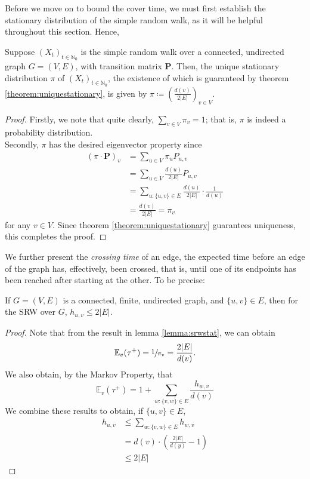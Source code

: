 	Before we move on to bound the cover time, we must first establish the stationary 
	distribution of the simple random walk, as it will be helpful throughout this section.
	Hence,
	\begin{lemma}
		\label{lemma:srwstat}
		Suppose $(X_t)_{t\in\mathbb{N}_0}$ is the simple random walk over a connected,
		undirected graph $G = (V,E)$, with transition matrix $\mathbf{P}$. Then, 
		the unique stationary distribution $\pi$ of $(X_t)_{t\in\mathbb{N}_0}$, the 
		existence of which is guaranteed by theorem \ref{theorem:uniquestationary},
		is given by $\pi \coloneqq \left(\frac{d(v)}{2|E|}\right)_{v \in V}$.
	\end{lemma}
	\begin{proof}
		Firstly, we note that quite clearly, $\sum_{v\in V} \pi_v = 1$; that is, $\pi$
		is indeed a probability distribution. \\
		Secondly, $\pi$ has the desired eigenvector property since
		\begin{align*}
			(\pi\cdot\mathbf{P})_v &= \sum_{u \in V} \pi_u P_{u,v} \\
			&= \sum_{u\in V} \frac{d(u)}{2|E|} P_{u,v} \\
			&= \sum_{u:\{u,v\}\in E} \frac{d(u)}{2|E|} \cdot \frac{1}{d(u)} \\
			&= \frac{d(v)}{2|E|} = \pi_v
		\end{align*}
		for any $v \in V$. Since theorem \ref{theorem:uniquestationary} guarantees 
		uniqueness, this completes the proof.
	\end{proof}
	We further present the \emph{crossing time} of an edge, the expected time before an edge of
	the graph has, effectively, been crossed, that is, until one of its endpoints has been 
	reached after starting at the other. To be precise:
	\begin{lemma}
		\label{lemma:srwhit}
		If $G=(V,E)$ is a connected, finite, undirected graph, and $\{u,v\} \in E$, then 
		for the SRW over $G$, $h_{u,v} \leq 2|E|$.
	\end{lemma}
	\begin{proof}
		Note that from the result in lemma \ref{lemma:srwstat}, we can obtain 
		$$
			\mathbb{E}_v(\tau^+) = \sfrac{1}{\pi_v} = \frac{2|E|}{d(v)}.
		$$
		We also obtain, by the Markov Property, that 
		$$
			\mathbb{E}_v(\tau^+) = 1 + \sum_{w : \{v,w\}\in E} \frac{h_{w,v}}{d(v)}
		$$
		We combine these results to obtain, if $\{u, v\} \in E$,
		\begin{align*}
			h_{u,v} &\leq \sum_{w : \{v,w\}\in E} h_{w,v}\\
			&= d(v) \cdot \left(\frac{2|E|}{d(y)} - 1\right) \\
			&\leq 2|E|
		\end{align*}
	\end{proof}

